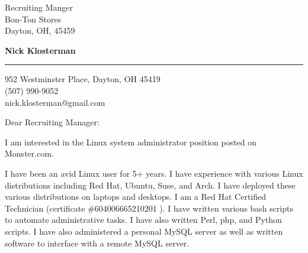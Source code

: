 \documentclass{letter} %
\newcommand{\person}{Recruiting Manager}
\newcommand{\position}{Linux system administrator }%
\begin{document}
\signature{Nick Klosterman}           %
\longindentation=0pt                       %
\let\raggedleft\raggedright                %
 

 
\begin{letter}{Recruiting Manger \\
Bon-Ton Stores \\
Dayton, OH, 45459 \\

}

  \begin{flushright}
 \hfill   \large\bf Nick Klosterman  \\
\end{flushright}
\begin{flushright}
    \medskip\hrule height 1pt
    \hfill 952 Westminster Place, Dayton, OH 45419 \\
    \hfill (507) 990-9052 \\
    \hfill nick.klosterman@gmail.com
  \end{flushright} 
\vfill %

 
\opening{Dear \person :} 

\noindent 
I am interested in the \position position posted on Monster.com. 

\noindent
I have been an avid Linux user for 5+ years.
I have experience with various Linux distributions including Red Hat, Ubuntu, Suse, and Arch.
I have deployed these various distributions on laptops and desktops.
I am a Red Hat Certified Technician (certificate \#604006665210201 ).
I have written various bash scripts to automate administrative tasks. 
I have also written Perl, php, and Python scripts.
I have also administered a personal MySQL server as well as written software to interface with a remote MySQL server.



\end{letter}
\end{document}
